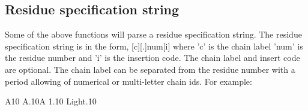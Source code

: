 \subsection*{Residue specification string }

Some of the above functions will parse a residue specification string. The residue specification string is in the form, \mbox{[}c\mbox{]}\mbox{[}.\mbox{]}num\mbox{[}i\mbox{]} where 'c' is the chain label 'num' is the residue number and 'i' is the insertion code. The chain label and insert code are optional. The chain label can be separated from the residue number with a period allowing of numerical or multi-\/letter chain ids. For example\-: \begin{DoxyVerb}  A10
  A.10A
  1.10
  Light.10\end{DoxyVerb}
 
